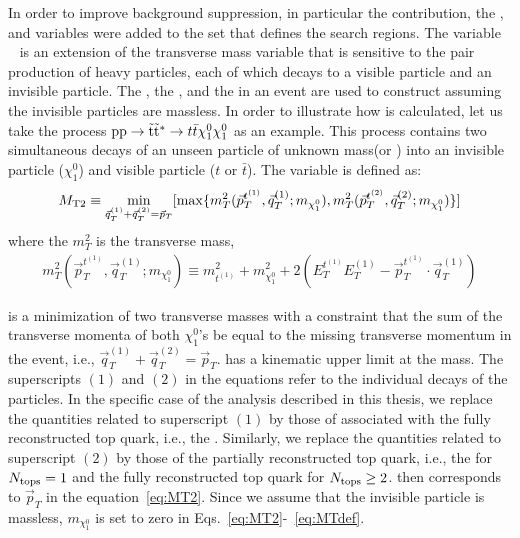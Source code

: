 In order to improve background suppression, in particular the \ttbar
contribution, the \MET, \HT and \MTTwo variables were added to the 
set that defines the search regions. The variable 
\MTTwo~\cite{Lester:1999tx,Barr:2003rg} is an extension of the transverse 
mass variable that is sensitive to the pair production of heavy particles, each
of which decays to a visible particle and an invisible particle.
The \pTop, the \pRsystem, and the \MET in an event
are used to construct \MTTwo assuming the invisible particles are massless.
In order to illustrate how \MTTwo is calculated, let us take the process 
${\rm pp} \rightarrow \tilde{{\mathrm t}}\tilde{{\mathrm t}}^\ast\rightarrow t\bar{t}\chi_1^0\chi_1^0$
as an example. This process contains two simultaneous decays of an unseen 
particle of unknown mass(\sTop or \santiTop) into an invisible 
particle ($\chi_1^0$) and visible particle ($t$ or $\bar{t}$). The
variable \MTTwo is defined as:
\begin{equation} \label{eq:MT2}
   \begin{array}{l}
     \displaystyle{ \MTTwo \equiv \min_{\vec{q}_{T}^{(1)}+\vec{q}_{T}^{(2)} = \vec{p}_{T}} [\max\{m_{T}^2(\vec{p}_{T}^{t^{(1)}}, \vec{q}_{T}^{(1)}; m_{\chi_1^0}), m_{T}^2(\vec{p}_{T}^{t^{(2)}}, \vec{q}_{T}^{(2)}; m_{\chi_1^0})\}]  } 
   \end{array}
\end{equation}
where the $m_{T}^2$ is the transverse mass,
\begin{equation} \label{eq:MTdef}
   \begin{array}{l}
     \displaystyle{
        m_{T}^2(\vec{p}_{T}^{t^{(1)}}, \vec{q}_{T}^{(1)}; m_{\chi_1^0}) \equiv m_{t^{(1)}}^{2} + m_{\chi_1^0}^2 + 2(E_{T}^{t^{(1)}}E_{T}^{(1)} - \vec{p}_{T}^{t^{(1)}} \cdot \vec{q}_{T}^{(1)})
     }
   \end{array}
\end{equation} 

\MTTwo is a minimization of two transverse masses with a constraint that 
the sum of the transverse momenta of both $\chi_1^0$'s be equal to the 
missing transverse momentum in the event, i.e., $\vec{q}_{T}^{(1)}+\vec{q}_{T}^{(2)} = \vec{p}_{T}$. 
\MTTwo has a kinematic upper limit at the \sTop mass. 
The superscripts $(1)$ and $(2)$ in the equations refer to the individual 
decays of the \sTop particles. In the specific case of the analysis described
in this thesis, we replace the quantities related to superscript $(1)$ by those
of associated with the fully reconstructed top quark, i.e., the \pTop. 
Similarly, we replace the quantities related to superscript $(2)$ by those
of the partially reconstructed top quark, i.e., the \pRsystem 
for $N_{\text{tops}} =1$ and the fully reconstructed top quark for $N_{\text{tops}} \ge 2$. 
\MET then corresponds to $\vec{p}_{T}$ in the equation~\ref{eq:MT2}. 
Since we assume that the invisible particle is massless, $m_{\chi_1^0}$ is set to zero in Eqs.~\ref{eq:MT2}-~\ref{eq:MTdef}. 

